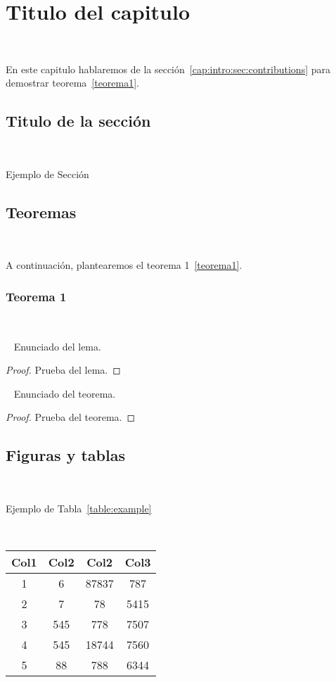\chapter{Titulo del capitulo}
~\label{cap:example}

En este capitulo hablaremos de la sección~\ref{cap:intro:sec:contributions}
para demostrar teorema~\ref{teorema1}.~

\section{Titulo de la sección}
~\label{cap:example:sec:title}

Ejemplo de Sección~

\section{Teoremas}
~\label{cap:example:sec:theorem}

A continuación, plantearemos el teorema 1~\ref{teorema1}.

\subsection{Teorema 1}
~\label{cap:example:sec:theorem:subsec:1st-theorem}

\begin{lemma}~\label{lema1}
	Enunciado del lema.
\end{lemma}

\begin{proof}
	Prueba del lema.
\end{proof}

\begin{theorem}~\label{teorema1}
	Enunciado del teorema.
\end{theorem}

\begin{proof}
	Prueba del teorema.
\end{proof}

\section{Figuras y tablas}
~\label{cap:example:sec:fig-and-tables}

Ejemplo de Tabla~\ref{table:example}

\begin{center}~\label{table:example}
	\begin{tabular}{||c c c c||} 
	 \hline
	 Col1 & Col2 & Col2 & Col3 \\ [0.5ex] 
	 \hline\hline
	 1 & 6 & 87837 & 787 \\ 
	 \hline
	 2 & 7 & 78 & 5415 \\
	 \hline
	 3 & 545 & 778 & 7507 \\
	 \hline
	 4 & 545 & 18744 & 7560 \\
	 \hline
	 5 & 88 & 788 & 6344 \\ [1ex] 
	 \hline
	\end{tabular}
\end{center}

